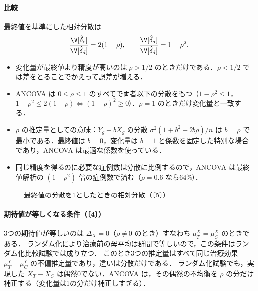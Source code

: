 \paragraph{比較}
最終値を基準にした相対分散は
\[
\frac{\V[\hat\delta_c]}{\V[\hat\delta_d]}=2(1-\rho),\qquad \frac{\V[\hat\delta_a]}{\V[\hat\delta_d]}=1-\rho^2 .
\]
\begin{itemize}
\item 変化量が最終値より精度が高いのは $\rho>1/2$ のときだけである．$\rho<1/2$ では差をとることでかえって誤差が増える．
\item ANCOVA は $0\le\rho\le1$ のすべてで両者以下の分散をもつ（$1-\rho^2\le1$，$1-\rho^2\le2(1-\rho)\iff(1-\rho)^2\ge0$）．$\rho=1$ のときだけ変化量と一致する．
\item $\rho$ の推定量としての意味：$\bar Y_g-b\bar X_g$ の分散 $\sigma^2(1+b^2-2b\rho)/n$ は $b=\rho$ で最小である．最終値は $b=0$，変化量は $b=1$ と係数を固定した特別な場合であり，ANCOVA は最適な係数を使っている．
\item 同じ精度を得るのに必要な症例数は分散に比例するので，ANCOVA は最終値解析の $(1-\rho^2)$ 倍の症例数で済む（$\rho=0.6$ なら64\%）．
\end{itemize}
\begin{figure}[htbp]
\centering
{}
\caption{最終値の分散を1としたときの相対分散（〔5〕）}\label{fig:08-ancova}
\end{figure}

\paragraph{期待値が等しくなる条件（〔4〕）}
3つの期待値が等しいのは $\Delta_X=0$（$\rho\ne0$ のとき）すなわち $\mu_T^X=\mu_C^X$ のときである．
ランダム化により治療前の母平均は群間で等しいので，この条件はランダム化比較試験では成り立つ．
このとき3つの推定量はすべて同じ治療効果 $\mu_T^Y-\mu_C^Y$ の不偏推定量であり，違いは分散だけである．
ランダム化試験でも，実現した $\bar X_T-\bar X_C$ は偶然0でない．ANCOVA は，その偶然の不均衡を $\rho$ の分だけ補正する（変化量は1の分だけ補正しすぎる）．

